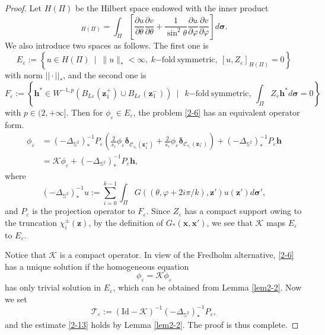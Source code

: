 \documentclass[12pt,reqno]{amsart}
\numberwithin{equation}{section}
\theoremstyle{definition}
\theoremstyle{remark}
\begin{document}
	\begin{proof}
		Let $H(\Pi)$ be the Hilbert space endowed with the inner product
		\begin{equation*}
			[u,v]_{H(\Pi)}=\int_{\Pi}\left[\frac{\partial u}{\partial\theta}\frac{\partial v}{\partial \theta}+\frac{1}{\sin^2\theta}\frac{\partial u}{\partial\varphi}\frac{\partial v}{\partial \varphi}\right]d\boldsymbol\sigma.
		\end{equation*}
		We also introduce two spaces as follows. The first one is
		\begin{equation*}
			E_\varepsilon:=\left\{u\in H(\Pi)\,\,\, \big|\, \,\, \|u\|_*<\infty, \ k\mathrm{-fold \ symmetric}, \ [u,Z_\varepsilon]_{H(\Pi)}=0\right\}
		\end{equation*}
		with norm $||\cdot||_*$, and the second one is
		\begin{equation*}
			F_\varepsilon:=\left\{\mathbf h^* \in W^{-1,p}(B_{L\varepsilon}(\boldsymbol z_1^+)\cup B_{L\varepsilon}(\boldsymbol z_1^-)) \,\,\, \big| \,\,\, \ k\mathrm{-fold \ symmetric}, \ \int_{\Pi}Z_\varepsilon\mathbf h^*d\boldsymbol \sigma=0\right\}
		\end{equation*}
		with $p\in (2,+\infty]$. Then for $\phi_\varepsilon\in E_\varepsilon$, the problem \eqref{2-6} has an equivalent operator form.
		\begin{equation*}
			\begin{split}
				\phi_\varepsilon&=(-\Delta_{\mathbb S^2})_*^{-1}P_\varepsilon\left(\frac{2}{s_\varepsilon }\phi_\varepsilon\boldsymbol{\delta}_{\mathcal C_{s_\varepsilon}(\boldsymbol z^+_1)}+\frac{2}{s_\varepsilon }\phi_\varepsilon\boldsymbol{\delta}_{\mathcal C_{s_\varepsilon}(\boldsymbol z^-_1)}\right)+(-\Delta_{\mathbb S^2})_*^{-1} P_\varepsilon \mathbf h\\
				&=\mathscr K\phi_\varepsilon+(-\Delta_{\mathbb S^2})_*^{-1} P_\varepsilon \mathbf h,
			\end{split}
		\end{equation*}
		where
		\begin{equation*}
			(-\Delta_{\mathbb S^2})_*^{-1}u:=\sum\limits_{i=0}^{k-1}\int_{\Pi}G((\theta,\varphi+2i\pi/k),\boldsymbol z')u(\boldsymbol z')d\boldsymbol \sigma',
		\end{equation*}
		and $P_\varepsilon$ is the projection operator to $F_\varepsilon$. Since $Z_\varepsilon$ has a compact support owing 
		to the truncation $\chi_i^\pm(\boldsymbol z)$, by the definition of ${G_*}(\boldsymbol x,\boldsymbol x')$, 
		we see that $\mathscr K$ maps $E_\varepsilon$ to $E_\varepsilon$.
		
		Notice that $\mathscr K$ is a compact operator. In view of the Fredholm alternative, \eqref{2-6} has a unique solution if the homogeneous equation
		\begin{equation*}
			\phi_\varepsilon=\mathscr K\phi_\varepsilon
		\end{equation*}
		has only trivial solution in $E_\varepsilon$, which can be obtained from Lemma \ref{lem2-2}. Now we set
		$$\mathcal T_\varepsilon:=(\text{Id}-\mathscr K)^{-1}(-\Delta_{\mathbb S^2})_*^{-1} P_\varepsilon,$$
		and the estimate \eqref{2-13} holds by Lemma \ref{lem2-2}. The proof is thus complete.
	\end{proof}
	
\end{document}
